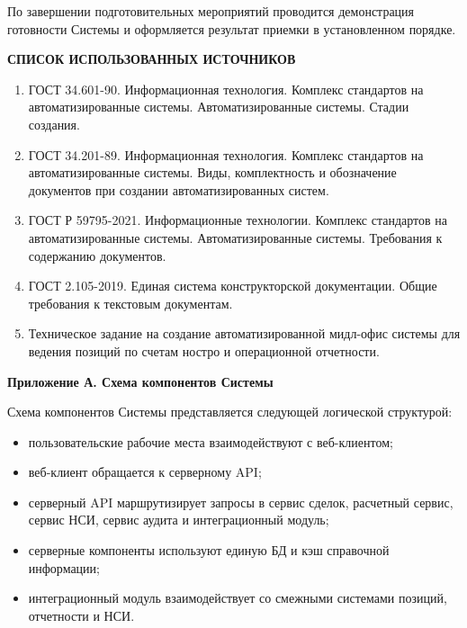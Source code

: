 \documentclass[a4paper,14pt]{extarticle}
\begin{document}
По завершении подготовительных мероприятий проводится демонстрация готовности Системы и оформляется результат приемки в установленном порядке.

\newpage
\begin{center}
\textbf{\MakeUppercase{СПИСОК ИСПОЛЬЗОВАННЫХ ИСТОЧНИКОВ}}
\end{center}

\begin{enumerate}[label=\arabic*.,itemsep=1mm]
  \item ГОСТ 34.601-90. Информационная технология. Комплекс стандартов на автоматизированные системы. Автоматизированные системы. Стадии создания.
  \item ГОСТ 34.201-89. Информационная технология. Комплекс стандартов на автоматизированные системы. Виды, комплектность и обозначение документов при создании автоматизированных систем.
  \item ГОСТ Р 59795-2021. Информационные технологии. Комплекс стандартов на автоматизированные системы. Автоматизированные системы. Требования к содержанию документов.
  \item ГОСТ 2.105-2019. Единая система конструкторской документации. Общие требования к текстовым документам.
  \item Техническое задание на создание автоматизированной мидл-офис системы для ведения позиций по счетам ностро и операционной отчетности.
\end{enumerate}

\newpage
\begin{center}
\textbf{Приложение А. Схема компонентов Системы}
\end{center}

Схема компонентов Системы представляется следующей логической структурой:
\begin{itemize}[itemsep=1mm]
  \item пользовательские рабочие места взаимодействуют с веб-клиентом;
  \item веб-клиент обращается к серверному API;
  \item серверный API маршрутизирует запросы в сервис сделок, расчетный сервис, сервис НСИ, сервис аудита и интеграционный модуль;
  \item серверные компоненты используют единую БД и кэш справочной информации;
  \item интеграционный модуль взаимодействует со смежными системами позиций, отчетности и НСИ.
\end{itemize}
\end{document}
